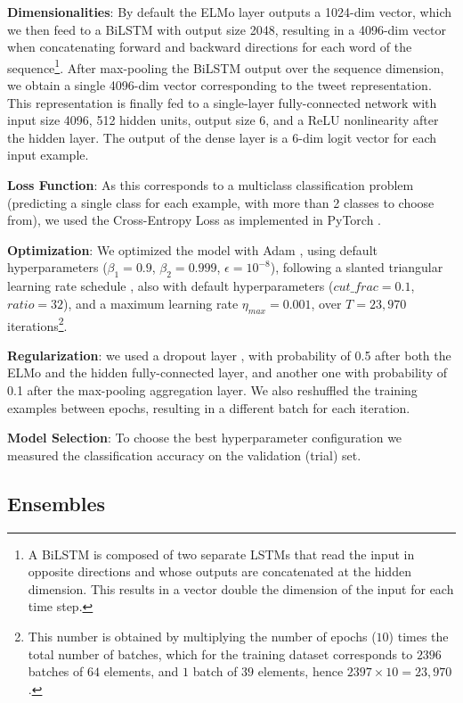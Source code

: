\documentclass[11pt,a4paper]{article}
\begin{document}
\textbf{Dimensionalities}: By default the ELMo layer outputs a 1024-dim vector,
which we then feed to a BiLSTM with output size 2048, resulting in a 4096-dim
vector when concatenating forward and backward directions for each word
of the sequence\footnote{A BiLSTM is composed of two separate LSTMs that read
the input in opposite directions and whose outputs are concatenated at the
hidden dimension. This results in a vector double the dimension of the input
for each time step.}. After max-pooling the BiLSTM output over the sequence
dimension, we obtain a single 4096-dim vector corresponding to the tweet
representation. This representation is finally fed to a single-layer
fully-connected network with input size 4096, 512 hidden units, output size 6,
and a ReLU nonlinearity after the hidden layer. The output of the
dense layer is a 6-dim logit vector for each input example.

\textbf{Loss Function}: As this corresponds to a multiclass classification
problem (predicting a single class for each example, with more than 2 classes to
choose from), we used the Cross-Entropy Loss as implemented in PyTorch
\cite{paszke2017automatic}.

\textbf{Optimization}: We optimized the model with Adam
\cite{DBLP:journals/corr/KingmaB14}, using default hyperparameters
($\beta_1=0.9$, $\beta_2=0.999$, $\epsilon=10^{-8}$), following a slanted
triangular learning rate schedule \cite{howard2018universal}, also with default
hyperparameters ($cut\_frac=0.1$, $ratio=32$), and a maximum learning rate
$\eta_{max}=0.001$, over $T=23,970$ iterations\footnote{This number is obtained
    by multiplying the number of epochs ($10$) times the total number of
    batches, which for the training dataset corresponds to $2396$ batches of
$64$ elements, and $1$ batch of $39$ elements, hence $2397\times10=23,970$.}.

\textbf{Regularization}: we used a dropout layer \cite{srivastava2014dropout},
with probability of 0.5 after both the ELMo and the hidden fully-connected
layer, and another one with probability of 0.1 after the max-pooling aggregation
layer. We also reshuffled the training examples between epochs, resulting in a
different batch for each iteration. 

\textbf{Model Selection}: To choose the best hyperparameter configuration we
measured the classification accuracy on the validation (trial) set. 


\subsection{Ensembles}
 
\end{document}
